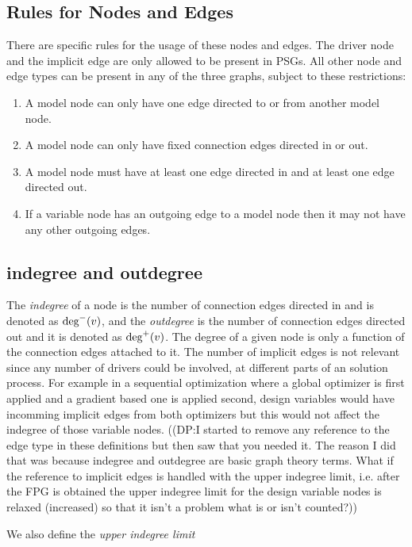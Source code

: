 \subsection{Rules for Nodes and Edges}
	\label{ss:rules}
	There are specific rules for the usage of these nodes and edges.
	The driver node and the implicit edge are only allowed to be present in PSGs. All 
	other node and edge types can be present in any of the three graphs, subject to these restrictions: 
	\begin{enumerate}
	\item A model node can only have one edge directed to or from another model node.
	\item A model node can only have fixed connection edges directed in or out.
	\item A model node must have at least one edge directed in and at least one edge 
	  directed out.
	\item If a variable node has an outgoing edge to a model node then it may not have 
	  any other outgoing edges.
	\end{enumerate}

\subsection{indegree and outdegree}
	\label{s:indegree-outdegree}
	The \emph{indegree} of a node is the number of connection edges directed in and 
	is denoted as $\textrm{deg}^-(v)$, and the \emph{outdegree} 
	is the number of connection edges directed out and it is denoted as $\textrm{deg}^+(v)$.
	The degree of a given node is only a function of the connection edges 
	attached to it. The number of implicit edges is not relevant since any number 
	of drivers could be involved, at different parts of an solution process. For 
	example in a sequential optimization where a global optimizer is first applied
	and a gradient based one is applied second, design variables would have incomming 
	implicit edges from both optimizers but this would not affect the indegree of those
	variable nodes. 
	((DP:I started to remove any reference to the edge type in these definitions but then saw that you needed it. The reason I did that was because indegree and outdegree are basic graph theory terms. What if the reference to implicit edges is handled with the upper indegree limit, i.e. after the FPG is obtained the upper indegree limit for the design variable nodes is relaxed (increased) so that it isn't a problem what is or isn't counted?))

	We also define the \emph{upper indegree limit} 

